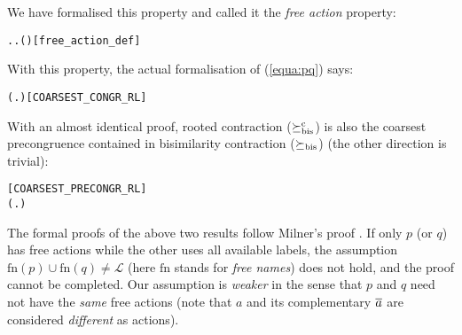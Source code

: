 We have formalised this property and
 called it the \emph{free action} property:
\begin{alltt}
  \HOLSymConst{\HOLTokenEquiv{}} \HOLSymConst{\HOLTokenExists{}}. \HOLSymConst{\HOLTokenForall{}}. \HOLSymConst{\HOLTokenNeg{}}( \HOLTokenWeakTransBegin{} \HOLTokenWeakTransEnd {})\hfill{[free_action_def]}
\end{alltt}
%
With this property, the actual formalisation of (\ref{equa:pq}) says:
\begin{alltt}
\HOLTokenTurnstile{}   \HOLSymConst{\HOLTokenConj{}}   \HOLSymConst{\HOLTokenImp{}} (\HOLSymConst{\HOLTokenForall{}}.  \HOLSymConst{\ensuremath{+}}  \HOLSymConst{\HOLTokenWeakEQ}  \HOLSymConst{\ensuremath{+}} ) \HOLSymConst{\HOLTokenImp{}}  \HOLSymConst{\HOLTokenObsCongr} \hfill{[COARSEST_CONGR_RL]}
\end{alltt}

With an almost identical proof, rooted contraction
($\mathrel{\succeq^{\rm{c}}_{\rm{bis}}}$) is also the coarsest
precongruence contained in bisimilarity contraction ($\mathrel{\succeq_{\rm{bis}}}$)
(the other direction is trivial):
\vspace{-2ex}
\begin{alltt}
\hfill{[COARSEST_PRECONGR_RL]}
\HOLTokenTurnstile{}   \HOLSymConst{\HOLTokenConj{}}   \HOLSymConst{\HOLTokenImp{}} (\HOLSymConst{\HOLTokenForall{}}.  \HOLSymConst{\ensuremath{+}}  \HOLSymConst{\HOLTokenContracts{}}  \HOLSymConst{\ensuremath{+}} ) \HOLSymConst{\HOLTokenImp{}}  \HOLSymConst{\HOLTokenObsContracts} 
\end{alltt}

The formal proofs  of the above two results  follow Milner's proof
\cite{Mil89}. If only $p$ (or $q$) has free actions while the other uses all available
labels, the assumption $\mathrm{fn}(p) \cup
\mathrm{fn}(q) \neq \mathscr{L}$ (here $\mathrm{fn}$ stands for \emph{free
  names}) does not hold, and the proof cannot be completed. Our
assumption is \emph{weaker}
in the sense that $p$ and $q$ need not have the
\emph{same} free actions (note that $a$ and its complementary  $\overline{a}$ are
considered \emph{different} as actions).

